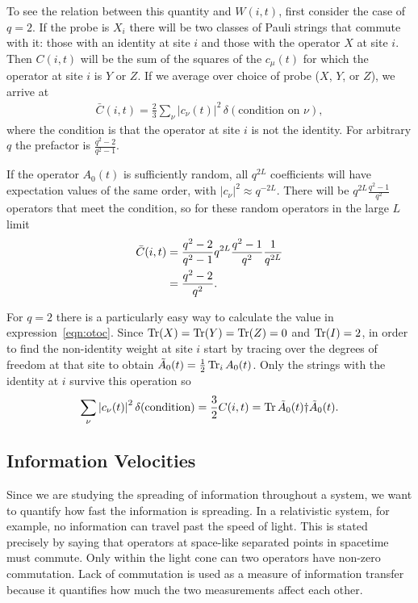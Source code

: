 To see the relation between this quantity and $W(i,t)$, first consider the case of $q=2$. If the probe is $X_i$ there will be two classes of Pauli strings that commute with it: those with an identity at site $i$ and those with the operator $X$ at site $i$. Then $C(i,t)$ will be the sum of the squares of the $c_\mu(t)$ for which the operator at site $i$ is $Y$ or $Z$. If we average over choice of probe ($X$, $Y$, or $Z$), we arrive at 
\begin{align}
\bar{C}(i,t) = \frac{2}{3}\sum_\nu|c_\nu(t)|^2\,\delta(\text{condition 
	on $\nu$}),\label{eqn:otoc}
\end{align}
where the condition is that the operator at site $i$ is not the identity. For arbitrary $q$ the prefactor is $\frac{q^2-2}{q^2-1}$. 

If the operator $A_0(t)$ is sufficiently random, all $q^{2L}$ coefficients will have expectation values of the same order, with $|c_\nu|^2 \approx q^{-2L}$. There will be $q^{2L}\frac{q^2-1}{q^2}$ operators that meet the condition, so for these random operators in the large $L$ limit
\begin{align}
\bar{C}(i,t) &= \frac{q^2-2}{q^2-1}q^{2L}\frac{q^2-1}{q^2}\frac{1}{q^{2L}}\nonumber\\
&= \frac{q^2-2}{q^2}\nonumber.
\end{align}

For $q=2$ there is a particularly easy way to calculate the value in expression~\ref{eqn:otoc}. Since $\operatorname{Tr}(X) = \operatorname{Tr}(Y)=\operatorname{Tr}(Z) = 0$ and $\operatorname{Tr}(I) = 2$, in order to find the non-identity weight at site $i$ start by tracing over the degrees of freedom at that site to obtain $\tilde{A}_0(t) = \frac{1}{2}\operatorname{Tr}_iA_0(t)$. Only the strings with the identity at $i$ survive this operation so
\begin{align}
\sum_\nu \left|c_\nu(t)\right|^2\delta(\text{condition}) = \frac{3}{2}C(i,t) =  \operatorname{Tr} 
	\tilde{A}_0(t)\dag\tilde{A}_0(t).
\end{align}

\subsection{Information Velocities} \label{sub:vels}

Since we are studying the spreading of information throughout a system, we want to quantify how fast the information is spreading. In a relativistic system, for example, no information can travel past the speed of light. This is stated precisely by saying that operators at space-like separated points in spacetime must commute. Only within the light cone can two operators have non-zero commutation. Lack of commutation is used as a measure of information transfer because it quantifies how much the two measurements affect each other.

